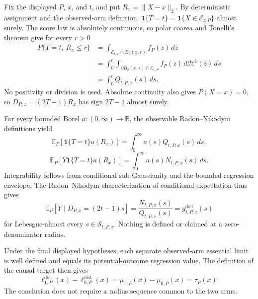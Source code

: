 Fix the displayed \(P\), \(x\), and \(t\), and put
\(R_x=\lVert X-x\rVert_2\).  By deterministic assignment and the observed-arm
definition,
\(\mathbf1\{T=t\}=\mathbf1\{X\in\mathcal E_{t,P}\}\) almost surely.  The
score law is absolutely continuous, so polar coarea and Tonelli's theorem give
for every \(r>0\)
\[
\begin{aligned}
 P\{T=t,\ R_x\leq r\}
 &=\int_{\mathcal E_{t,P}\cap B_2(x,r)}f_P(z)\,dz\\
 &=\int_0^r\int_{\partial B_2(x,s)\cap\mathcal E_{t,P}}
 f_P(z)\,d\mathcal H^1(z)\,ds\\
 &=\int_0^rQ_{t,P,x}(s)\,ds.
\end{aligned}
\]
No positivity or division is used.  Absolute continuity also gives
\(P(X=x)=0\), so \(D_{P,x}=(2T-1)R_x\) has sign \(2T-1\) almost surely.

For every bounded Borel \(a:(0,\infty)\to\mathbb R\), the observable
Radon--Nikodym definitions yield
\[
 \mathbb E_P[\mathbf1\{T=t\}a(R_x)]
 =\int_0^\infty a(s)Q_{t,P,x}(s)\,ds,
\]
\[
 \mathbb E_P[Y\mathbf1\{T=t\}a(R_x)]
 =\int_0^\infty a(s)N_{t,P,x}(s)\,ds.
\]
Integrability follows from conditional sub-Gaussianity and the bounded
regression envelope.  The Radon--Nikodym characterization of conditional
expectation thus gives
\[
 \mathbb E_P[Y\mid D_{P,x}=(2t-1)s]
 =\frac{N_{t,P,x}(s)}{Q_{t,P,x}(s)}
 =g^{\mathrm{dist}}_{t,P,x}(s)
\]
for Lebesgue-almost every \(s\in\mathcal S_{t,P,x}\).  Nothing is defined or
claimed at a zero-denominator radius.

Under the final displayed hypotheses, each separate observed-arm essential
limit is well defined and equals its potential-outcome regression value.  The
definition of the causal target then gives
\[
 \ell^{\mathrm{dist}}_{1,P}(x)-\ell^{\mathrm{dist}}_{0,P}(x)
 =\mu_{1,P}(x)-\mu_{0,P}(x)=\tau_P(x).
\]
The conclusion does not require a radius sequence common to the two arms.